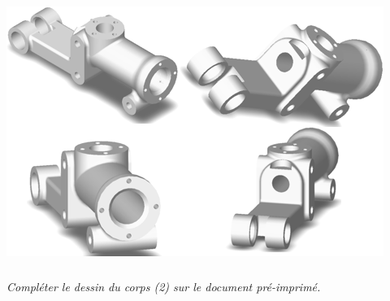 \begin{multicols}{2}
\begin{multicols}{2}
\begin{center}
\includegraphics[width=\linewidth]{images/fig_01}
\end{center}

\subparagraph{}
\textit{Compléter le dessin du corps (2) sur le document pré-imprimé.}






\ifprof
\end{multicols}
\else
\end{multicols}
\fi

